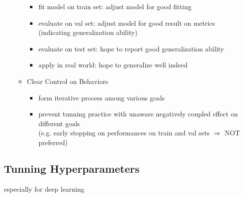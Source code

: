 \begin{itemize}
\begin{itemize}
\begin{itemize}
		\item fit model on train set: adjust model for good fitting
		\item evaluate on val set: adjust model for good result on metrics \\ 
		(indicating generalization ability)
		\item evaluate on test set: hope to report good generalization ability
		\item apply in real world: hope to generalize well indeed
		\end{itemize}
	\item Clear Control on Behaviors
		\begin{itemize}
		\item form iterative process among various goals
		\item prevent tunning practice with unaware negatively coupled effect on different goals \\
		(e.g. early stopping on performances on train and val sets $\Rightarrow$ NOT preferred)
		\end{itemize}
	\end{itemize}
\end{itemize}

\subsection{Tunning Hyperparameters}
especially for deep learning
